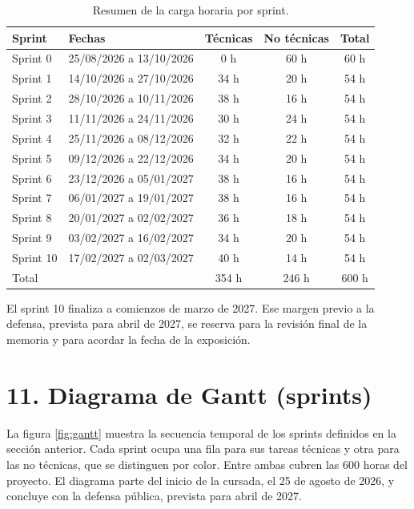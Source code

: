 \documentclass[
11pt, %
]{charter}
\begin{document}
\begin{table}[htpb]
\centering
\caption{Resumen de la carga horaria por sprint.}
\label{tab:resumenSprints}
\begin{tabularx}{\linewidth}{@{}|l|X|c|c|c|@{}}
\hline
\rowcolor[HTML]{C0C0C0}
Sprint & Fechas & Técnicas & No técnicas & Total \\ \hline
Sprint 0 & 25/08/2026 a 13/10/2026 & 0 h & 60 h & 60 h \\ \hline
Sprint 1 & 14/10/2026 a 27/10/2026 & 34 h & 20 h & 54 h \\ \hline
Sprint 2 & 28/10/2026 a 10/11/2026 & 38 h & 16 h & 54 h \\ \hline
Sprint 3 & 11/11/2026 a 24/11/2026 & 30 h & 24 h & 54 h \\ \hline
Sprint 4 & 25/11/2026 a 08/12/2026 & 32 h & 22 h & 54 h \\ \hline
Sprint 5 & 09/12/2026 a 22/12/2026 & 34 h & 20 h & 54 h \\ \hline
Sprint 6 & 23/12/2026 a 05/01/2027 & 38 h & 16 h & 54 h \\ \hline
Sprint 7 & 06/01/2027 a 19/01/2027 & 38 h & 16 h & 54 h \\ \hline
Sprint 8 & 20/01/2027 a 02/02/2027 & 36 h & 18 h & 54 h \\ \hline
Sprint 9 & 03/02/2027 a 16/02/2027 & 34 h & 20 h & 54 h \\ \hline
Sprint 10 & 17/02/2027 a 02/03/2027 & 40 h & 14 h & 54 h \\ \hline
Total & & 354 h & 246 h & 600 h \\ \hline
\end{tabularx}
\end{table}

El sprint 10 finaliza a comienzos de marzo de 2027. Ese margen previo a la defensa, prevista para abril de 2027, se reserva para la revisión final de la memoria y para acordar la fecha de la exposición.

\section{11. Diagrama de Gantt (sprints)}
\label{sec:gantt}

La figura \ref{fig:gantt} muestra la secuencia temporal de los sprints definidos en la sección anterior. Cada sprint ocupa una fila para sus tareas técnicas y otra para las no técnicas, que se distinguen por color. Entre ambas cubren las 600 horas del proyecto. El diagrama parte del inicio de la cursada, el 25 de agosto de 2026, y concluye con la defensa pública, prevista para abril de 2027.
\end{document}
